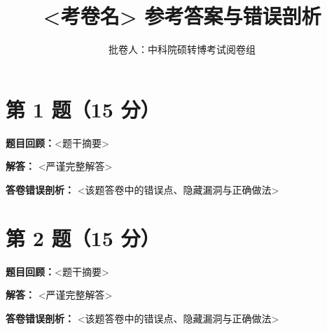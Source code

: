 \documentclass[11pt]{article}
\title{\textbf{<考卷名> 参考答案与错误剖析}}
\author{批卷人：中科院硕转博考试阅卷组}
\date{}
\begin{document}
\maketitle

\section*{第 1 题（15 分）}

\textbf{题目回顾：}<题干摘要>

\textbf{解答：}
<严谨完整解答>

\textbf{答卷错误剖析：}
<该题答卷中的错误点、隐藏漏洞与正确做法>

\section*{第 2 题（15 分）}

\textbf{题目回顾：}<题干摘要>

\textbf{解答：}
<严谨完整解答>

\textbf{答卷错误剖析：}
<该题答卷中的错误点、隐藏漏洞与正确做法>

\end{document}
